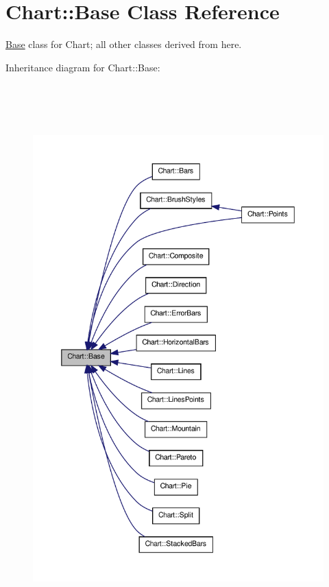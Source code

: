 \hypertarget{classChart_1_1Base}{
\section{Chart::Base Class Reference}
\label{classChart_1_1Base}
}


\hyperlink{classChart_1_1Base}{Base} class for Chart; all other classes derived from here.  




Inheritance diagram for Chart::Base:\nopagebreak
\begin{figure}[H]
\begin{center}
\leavevmode
\includegraphics[height=600pt]{classChart_1_1Base__inherit__graph}
\end{center}
\end{figure}


